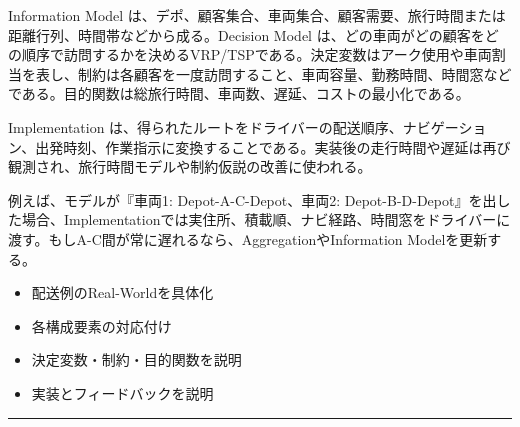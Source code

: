 Information Model は、デポ、顧客集合、車両集合、顧客需要、旅行時間または距離行列、時間帯などから成る。Decision Model は、どの車両がどの顧客をどの順序で訪問するかを決めるVRP/TSPである。決定変数はアーク使用や車両割当を表し、制約は各顧客を一度訪問すること、車両容量、勤務時間、時間窓などである。目的関数は総旅行時間、車両数、遅延、コストの最小化である。\par
Implementation は、得られたルートをドライバーの配送順序、ナビゲーション、出発時刻、作業指示に変換することである。実装後の走行時間や遅延は再び観測され、旅行時間モデルや制約仮説の改善に使われる。\par
{}
例えば、モデルが『車両1: Depot-A-C-Depot、車両2: Depot-B-D-Depot』を出した場合、Implementationでは実住所、積載順、ナビ経路、時間窓をドライバーに渡す。もしA-C間が常に遅れるなら、AggregationやInformation Modelを更新する。\par
{}
\begin{itemize}
\item 配送例のReal-Worldを具体化
\item 各構成要素の対応付け
\item 決定変数・制約・目的関数を説明
\item 実装とフィードバックを説明
\end{itemize}
\vspace{2mm}\hrule\vspace{2mm}

